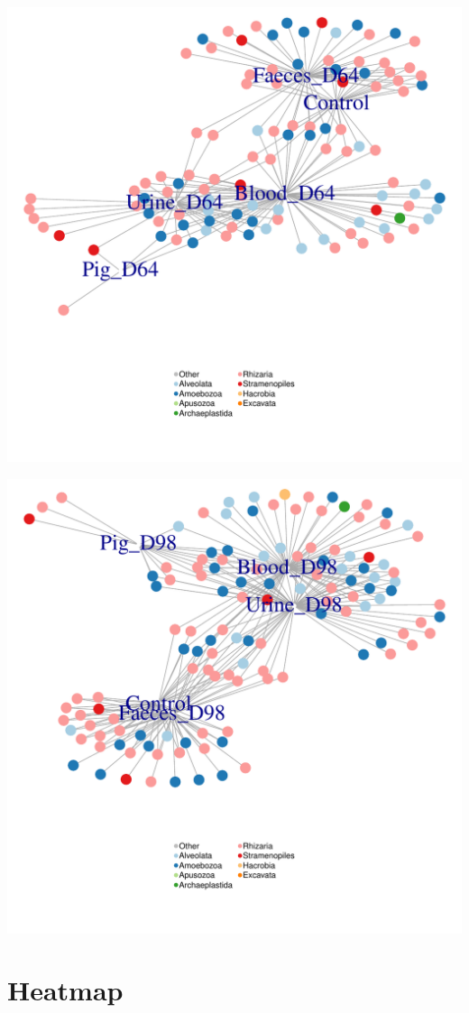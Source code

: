 \documentclass[11pt,english]{article}\usepackage[]{graphicx}\usepackage{xcolor}
\makeatletter
\def\maxwidth{ %
  \ifdim\Gin@nat@width>\linewidth
    \linewidth
  \else
    \Gin@nat@width
  \fi
}
\newenvironment{knitrout}{}{} %
\makeatother
\begin{document}
\begin{knitrout}
\color{fgcolor}
\includegraphics[width=\maxwidth]{figure/image-bioinc_64-1} 

\end{knitrout}

\begin{knitrout}
\color{fgcolor}
\includegraphics[width=\maxwidth]{figure/image-bioinc_98-1} 

\end{knitrout}



\section{Heatmap}



% 
% 
\end{document}
